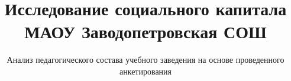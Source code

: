 \title[МАОУ Заводопетровская СОШ] {Исследование социального капитала МАОУ Заводопетровская СОШ}

\subtitle{Анализ педагогического состава учебного заведения на основе проведенного анкетирования}
